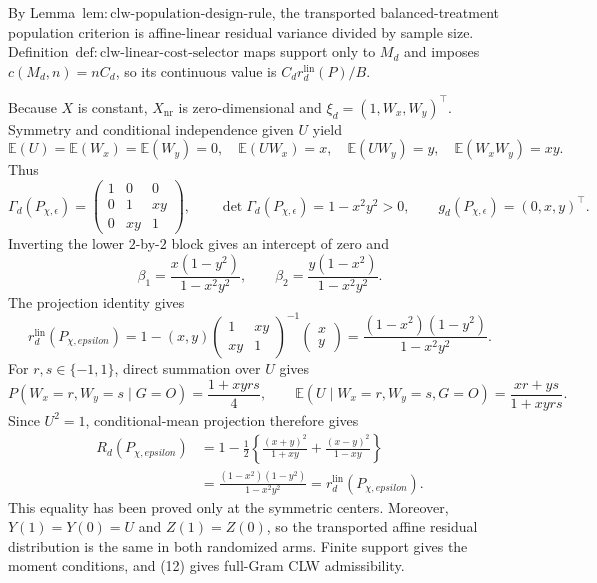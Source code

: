 By Lemma~\(\mathrm{lem{:}clw\text{-}population\text{-}design\text{-}rule}\), the transported balanced-treatment population criterion is affine-linear residual variance divided by sample size.  Definition~\(\mathrm{def{:}clw\text{-}linear\text{-}cost\text{-}selector}\) maps support only to \(M_d\) and imposes \(c(M_d,n)=nC_d\), so its continuous value is \(C_dr_d^{\mathrm{lin}}(P)/B\).

Because \(X\) is constant, \(X_{\mathrm{nr}}\) is zero-dimensional and \(\xi_d=(1,W_x,W_y)^\top\).  Symmetry and conditional independence given \(U\) yield
\[
 \mathbb E(U)=\mathbb E(W_x)=\mathbb E(W_y)=0,
 \quad \mathbb E(UW_x)=x,
 \quad \mathbb E(UW_y)=y,
 \quad \mathbb E(W_xW_y)=xy.                              \tag{11}
\]
Thus
\[
 \Gamma_d(P_{\chi,\epsilon})=
 \begin{pmatrix}1&0&0\\0&1&xy\\0&xy&1\end{pmatrix},
 \qquad
 \det\Gamma_d(P_{\chi,\epsilon})=1-x^2y^2>0,
 \qquad
 g_d(P_{\chi,\epsilon})=(0,x,y)^\top.                    \tag{12}
\]
Inverting the lower \(2\)-by-\(2\) block gives an intercept of zero and
\[
 \beta_1=\frac{x(1-y^2)}{1-x^2y^2},
 \qquad
 \beta_2=\frac{y(1-x^2)}{1-x^2y^2}.                       \tag{13}
\]
The projection identity gives
\[
 r_d^{\mathrm{lin}}(P_{\chi,epsilon})
 =1-(x,y)
 \begin{pmatrix}1&xy\\xy&1\end{pmatrix}^{-1}
 \begin{pmatrix}x\\y\end{pmatrix}
 =\frac{(1-x^2)(1-y^2)}{1-x^2y^2}.                        \tag{14}
\]
For \(r,s\in\{-1,1\}\), direct summation over \(U\) gives
\[
 P(W_x=r,W_y=s\mid G=O)=\frac{1+xyrs}{4},
 \qquad
 \mathbb E(U\mid W_x=r,W_y=s,G=O)=\frac{xr+ys}{1+xyrs}.
\]
Since \(U^2=1\), conditional-mean projection therefore gives
\[
\begin{aligned}
 R_d(P_{\chi,epsilon})
 &=1-\frac12\left\{
 \frac{(x+y)^2}{1+xy}+\frac{(x-y)^2}{1-xy}\right\}\\
 &=\frac{(1-x^2)(1-y^2)}{1-x^2y^2}
 =r_d^{\mathrm{lin}}(P_{\chi,epsilon}).                 \tag{15}
\end{aligned}
\]
This equality has been proved only at the symmetric centers.  Moreover, \(Y(1)=Y(0)=U\) and \(Z(1)=Z(0)\), so the transported affine residual distribution is the same in both randomized arms.  Finite support gives the moment conditions, and (12) gives full-Gram CLW admissibility.

